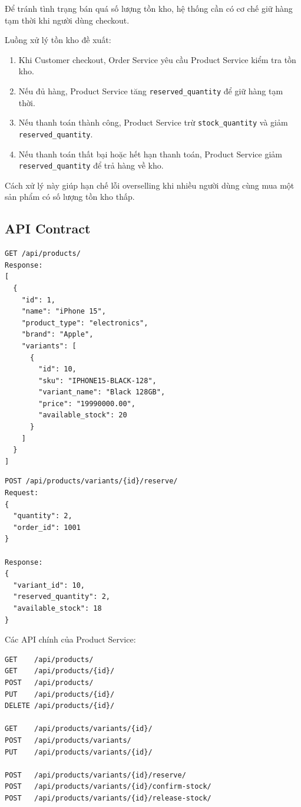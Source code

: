 Để tránh tình trạng bán quá số lượng tồn kho, hệ thống cần có cơ chế giữ hàng tạm thời khi người dùng checkout.

Luồng xử lý tồn kho đề xuất:

\begin{enumerate}
  \item Khi Customer checkout, Order Service yêu cầu Product Service kiểm tra tồn kho.
  \item Nếu đủ hàng, Product Service tăng \texttt{reserved\_quantity} để giữ hàng tạm thời.
  \item Nếu thanh toán thành công, Product Service trừ \texttt{stock\_quantity} và giảm \texttt{reserved\_quantity}.
  \item Nếu thanh toán thất bại hoặc hết hạn thanh toán, Product Service giảm \texttt{reserved\_quantity} để trả hàng về kho.
\end{enumerate}

Cách xử lý này giúp hạn chế lỗi overselling khi nhiều người dùng cùng mua một sản phẩm có số lượng tồn kho thấp.

\subsection{API Contract}

\begin{lstlisting}[style=code]
GET /api/products/
Response:
[
  {
    "id": 1,
    "name": "iPhone 15",
    "product_type": "electronics",
    "brand": "Apple",
    "variants": [
      {
        "id": 10,
        "sku": "IPHONE15-BLACK-128",
        "variant_name": "Black 128GB",
        "price": "19990000.00",
        "available_stock": 20
      }
    ]
  }
]
\end{lstlisting}

\begin{lstlisting}[style=code]
POST /api/products/variants/{id}/reserve/
Request:
{
  "quantity": 2,
  "order_id": 1001
}

Response:
{
  "variant_id": 10,
  "reserved_quantity": 2,
  "available_stock": 18
}
\end{lstlisting}

Các API chính của Product Service:

\begin{lstlisting}[style=code]
GET    /api/products/
GET    /api/products/{id}/
POST   /api/products/
PUT    /api/products/{id}/
DELETE /api/products/{id}/

GET    /api/products/variants/{id}/
POST   /api/products/variants/
PUT    /api/products/variants/{id}/

POST   /api/products/variants/{id}/reserve/
POST   /api/products/variants/{id}/confirm-stock/
POST   /api/products/variants/{id}/release-stock/
\end{lstlisting}

